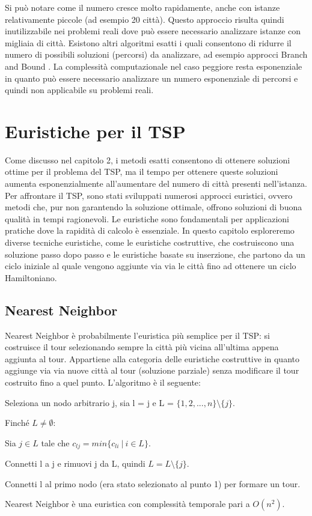 \documentclass[a4paper,12pt]{report}
\begin{document}
Si può notare come il numero cresce molto rapidamente, anche con istanze relativamente piccole (ad esempio 20 città). Questo approccio risulta quindi inutilizzabile nei problemi reali dove può essere necessario analizzare istanze con migliaia di città.
\newline \null \newline Esistono altri algoritmi esatti i quali consentono di ridurre il numero di possibili soluzioni (percorsi) da analizzare, ad esempio approcci Branch and Bound \cite{Branch and Bound}. La complessità computazionale nel caso peggiore resta esponenziale in quanto può essere necessario analizzare un numero esponenziale di percorsi e quindi non applicabile su problemi reali.

\chapter{Euristiche per il TSP}
Come discusso nel capitolo 2, i metodi esatti consentono di ottenere soluzioni ottime per il problema del TSP, ma il tempo per ottenere queste soluzioni aumenta esponenzialmente all'aumentare del numero di città presenti nell'istanza. Per affrontare il TSP, sono stati sviluppati numerosi approcci euristici, ovvero metodi che, pur non garantendo la soluzione ottimale, offrono soluzioni di buona qualità in tempi ragionevoli. Le euristiche sono fondamentali per applicazioni pratiche dove la rapidità di calcolo è essenziale. In questo capitolo esploreremo diverse tecniche euristiche, come le euristiche costruttive, che costruiscono una soluzione passo dopo passo e le euristiche basate su inserzione, che partono da un ciclo iniziale al quale vengono aggiunte via via le città fino ad ottenere un ciclo Hamiltoniano.
\section{Nearest Neighbor}
Nearest Neighbor è probabilmente l'euristica più semplice per il TSP: si costruisce il tour selezionando sempre la città più vicina all'ultima appena aggiunta al tour. Appartiene alla categoria delle euristiche costruttive in quanto aggiunge via via nuove città al tour (soluzione parziale) senza modificare il tour costruito fino a quel punto. L'algoritmo è il seguente:

\begin{legal}
  \item Seleziona un nodo arbitrario j, sia l = j e L = $\{1, 2, ..., n\} \setminus \{j\}$.
  \item Finché $L \neq \emptyset$:
  \begin{legal}
    \item Sia $j \in L$ tale che $c_{lj} = min\{c_{li} \  | \  i \in L\}$.
    \item Connetti l a j e rimuovi j da L, quindi $ L = L \setminus \{j\} $.
  \end{legal}
  \item Connetti l al primo nodo (era stato selezionato al punto 1) per formare un tour.
\end{legal}
\hfill \break
Nearest Neighbor è una euristica con complessità temporale pari a $O(n^2)$.
\end{document}
